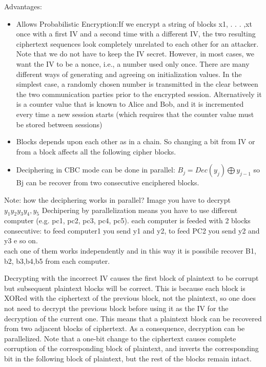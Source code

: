 \documentclass{article}
\begin{document}
Advantages:
\begin{itemize}
    \item Allows Probabilistic Encryption:If we encrypt a string of blocks x1, . . . ,xt once with a
first IV and a second time with a different IV, the two resulting ciphertext sequences
look completely unrelated to each other for an attacker. Note that we do not have
to keep the IV secret. However, in most cases, we want the IV to be a nonce, i.e., a
number used only once. There are many different ways of generating and agreeing
on initialization values. In the simplest case, a randomly chosen number is transmitted
in the clear between the two communication parties prior to the encrypted
session. Alternatively it is a counter value that is known to Alice and Bob, and it is
incremented every time a new session starts (which requires that the counter value
must be stored between sessions)
    \item Blocks depends upon each other as in a chain. So changing a bit from IV or from a block affects all the following cipher blocks.
    \item Deciphering in CBC mode can be done in parallel: $ B_j = Dec(y_j) \bigoplus y_{j-1}$ so Bj can be recover from two consecutive enciphered blocks.
\end{itemize}



Note: how the deciphering works in parallel?
Image you have to decrypt ${y_1 y_2 y_3 y_4, y_5}$
Dechipering by parallelization means you have to use different computer (e.g. pc1, pc2, pc3, pc4, pc5).
each computer is feeded with 2 blocks consecutive: to
feed computer1 you send y1 and y2, to feed PC2 you send y2 and y3 e so on.\\
each one of them works independently and in this way it is possibile recover B1, b2, b3,b4,b5 from each computer.
\vspace{1cm}

Decrypting with the incorrect IV causes the first block of plaintext to be corrupt but subsequent plaintext blocks will be correct. This is because each block is XORed with the ciphertext of the previous block, not the plaintext, so one does not need to decrypt the previous block before using it as the IV for the decryption of the current one. This means that a plaintext block can be recovered from two adjacent blocks of ciphertext. As a consequence, decryption can be parallelized. Note that a one-bit change to the ciphertext causes complete corruption of the corresponding block of plaintext, and inverts the corresponding bit in the following block of plaintext, but the rest of the blocks remain intact.
\end{document}
